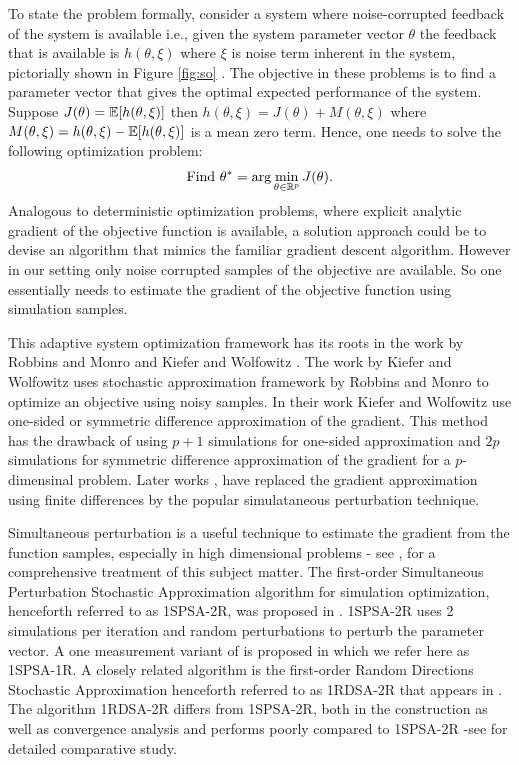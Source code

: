 \documentclass[letterpaper, 10 pt, conference]{ieeeconf}  %
\begin{document}
To state the problem formally, consider a system where noise-corrupted feedback of the 
system is available i.e., given the system parameter vector $\theta$ the feedback that is 
available is $h(\theta, \xi)$ where $\xi$ is noise term inherent in the system, 
pictorially shown in Figure \ref{fig:so} . The objective in these problems is to find a 
parameter vector that gives the optimal expected performance of the system. 
Suppose $J(\theta)=\mathbb{E}[h(\theta, \xi)]$ then $h(\theta, \xi)=J(\theta)+M(\theta,\xi)$ 
where $M(\theta,\xi)=h(\theta, \xi)-\mathbb{E}[h(\theta, \xi)]$ is a mean zero term. Hence, one 
needs to solve the following optimization problem:
\begin{align}
\mbox{Find } \theta^* = \arg\min_{\theta \in \mathbb{R}^p} J(\theta). \label{eq:pb}
\end{align}
Analogous to deterministic optimization problems, where explicit analytic gradient of the 
objective function is available, a solution approach could be to devise an algorithm that 
mimics the familiar gradient descent algorithm. However in our setting only noise corrupted 
samples of the objective are available. So one essentially needs to estimate the gradient 
of the objective function using simulation samples.

This adaptive system optimization framework has its roots in the work by 
Robbins and Monro \cite{robbins1951} and Kiefer and Wolfowitz \cite{kiefer1952}. 
The work by Kiefer and Wolfowitz uses stochastic approximation framework by 
Robbins and Monro to optimize an objective using noisy samples. In their work
Kiefer and Wolfowitz \cite{kiefer1952} use 
one-sided or symmetric difference approximation of the gradient. 
This method has the drawback of using $p+1$ simulations for one-sided approximation and
$2p$ simulations for symmetric difference approximation of the gradient for a 
$p$-dimensinal problem. Later works \cite{kushcla},\cite{spall} have replaced the 
gradient approximation using finite differences by the popular 
simulataneous perturbation technique.

Simultaneous perturbation is a useful technique to estimate the gradient from the function 
samples, especially in high dimensional problems - see \cite{bhatnagar-book},
\cite{spallbook} for a comprehensive treatment of this subject matter.
The first-order Simultaneous Perturbation Stochastic Approximation algorithm for 
simulation optimization, henceforth referred to as 1SPSA-2R, was 
proposed in \cite{spall}. 1SPSA-2R uses 2 simulations per iteration and random 
perturbations to perturb the parameter vector. 
A one measurement variant of \cite{spall} is proposed in \cite{spall2} which we refer here
as 1SPSA-1R.
A closely related algorithm is the first-order Random Directions 
Stochastic Approximation henceforth referred to as 1RDSA-2R that appears in
\cite[pp.~58-60]{kushcla}.
The algorithm 1RDSA-2R differs from 1SPSA-2R, both in the construction as well as 
convergence analysis and performs poorly compared to 1SPSA-2R -see 
\cite{chin1997comparative} for detailed comparative study. 
\end{document}
